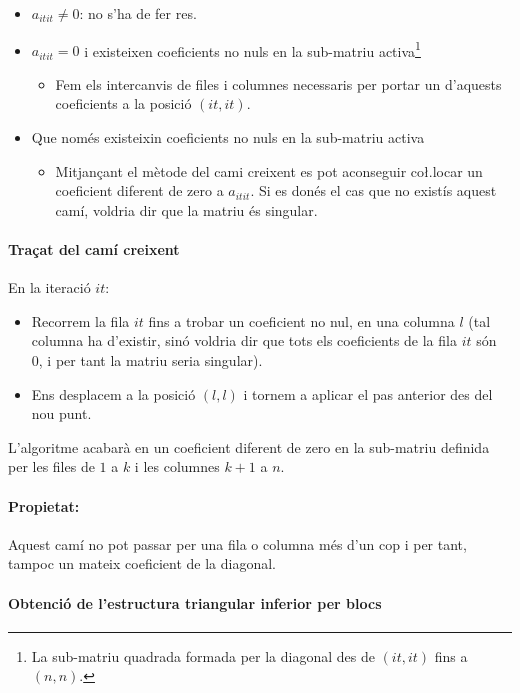 \documentclass[11pt,a4paper,twoside]{report}
\begin{document}
\begin{itemize}
\item $a_{it it} \neq 0$: no s'ha de fer res.
\item  $a_{it it} = 0$ i existeixen coeficients no nuls en la sub-matriu activa\footnote{La sub-matriu quadrada formada per la diagonal des de $(it,it)$ fins a $(n,n)$.}
\begin{itemize}
\item Fem els intercanvis de files i columnes necessaris per portar un d'aquests coeficients a la posició $(it, it)$.
\end{itemize}
\item Que només existeixin coeficients no nuls en la sub-matriu activa\footnotemark[\value{footnote}]
\begin{itemize}
\item Mitjançant el mètode del cami creixent es pot aconseguir co\l.locar un coeficient diferent de zero a $a_{it it}$. Si es donés el cas que no existís aquest camí, voldria dir que la matriu és singular.
\end{itemize}
\end{itemize}

\paragraph{Traçat del camí creixent} \mbox{}

En la iteració $it$:
\begin{itemize}
\item Recorrem la fila $it$ fins a trobar un coeficient no nul, en una columna $l$ (tal columna ha d'existir, sinó voldria dir que tots els coeficients de la fila $it$ són 0, i per tant la matriu seria singular).
\item Ens desplacem a la posició $(l,l)$ i tornem a aplicar el pas anterior des del nou punt.
\end{itemize}
 
L'algoritme acabarà en un coeficient diferent de zero en la sub-matriu definida per les files de $1$ a $k$ i les columnes $k+1$ a $n$.

\paragraph*{Propietat:}Aquest camí no pot passar per una fila o columna més d'un cop i per tant, tampoc un mateix coeficient de la diagonal.

\paragraph{Obtenció de l'estructura triangular inferior per blocs} \mbox{}
\end{document}
